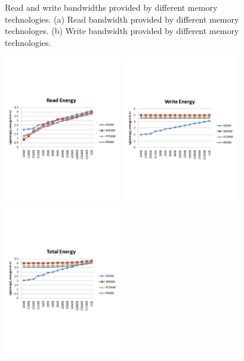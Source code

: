\documentclass[12pt,letterpaper, singlecolumn]{article}
\begin{document}
\begin{large}
\begin{figure}[htbp]
\vspace*{-1in}
\hspace{0.02in}
\makebox[3in][l]{\textcolor [rgb]{0,0,0} {\bf (a)}}
\makebox[3in][l]{\textcolor [rgb]{0,0,0} {\bf (b)}}

\caption{Read and write bandwidths provided by different memory technologies.
(a) Read bandwidth provided by different memory technologes. (b) Write bandwidth
provided by different memory technologies.}
\label{fig:memory-bw}
\end{figure}

\begin{figure}[htbp]
\centering
\includegraphics[width=2in]{figures/read-energy}
\includegraphics[width=2in]{figures/write-energy}
\includegraphics[width=2in]{figures/total-energy}\\


\end{figure}
\end{large}
\end{document}
